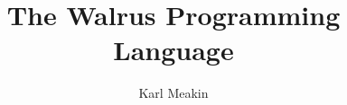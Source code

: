 \documentclass[12pt]{third-rep}
\title{The Walrus Programming Language}
\author{Karl Meakin}
\begin{document}
\dotitleandabstract

\tableofcontents
\listoffigures
\listoftables









\appendix



\end{document}
